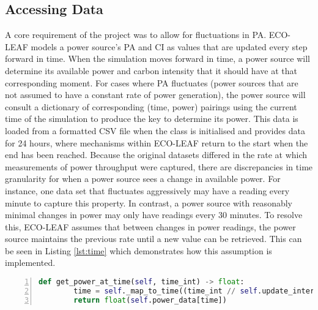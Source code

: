 \documentclass{l4proj}
\begin{document}
\subsection{Accessing Data}\label{imp:subsec:daa}
A core requirement of the project was to allow for fluctuations in PA. ECO-LEAF models a power source's PA and CI as values that are updated every step forward in time.
When the simulation moves forward in time, a power source will determine its available power and carbon intensity that it should have at that corresponding moment.
For cases where PA fluctuates (power sources that are not assumed to have a constant rate of power generation), the power source will consult a dictionary of corresponding (time, power) pairings using the current time of the simulation to produce the key to determine its power.
This data is loaded from a formatted CSV file when the class is initialised and provides data for 24 hours, where mechanisms within ECO-LEAF return to the start when the end has been reached.
Because the original datasets differed in the rate at which measurements of power throughput were captured, there are discrepancies in time granularity for when a power source sees a change in available power.
For instance, one data set that fluctuates aggressively may have a reading every minute to capture this property.
In contrast, a power source with reasonably minimal changes in power may only have readings every 30 minutes.
To resolve this, ECO-LEAF assumes that between changes in power readings, the power source maintains the previous rate until a new value can be retrieved.
This can be seen in Listing \ref{lst:time} which demonstrates how this assumption is implemented.\\

\begin{lstlisting}[language=python, numbers=left, caption={Example use of how a power source accesses it's available power.}, label=lst:time]
    def get_power_at_time(self, time_int) -> float:
        time = self._map_to_time((time_int // self.update_interval) % len(self.power_data))
        return float(self.power_data[time])
\end{lstlisting}
\end{document}
